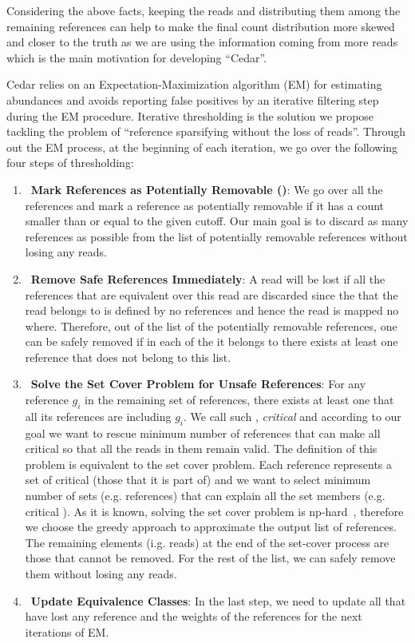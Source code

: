 Considering the above facts, keeping the reads and
distributing them among the remaining references
can help to make the final count distribution more skewed and closer to the truth
as we are using the information coming from more reads
which is the main motivation for developing ``Cedar''.

Cedar relies on an Expectation-Maximization algorithm (EM) for estimating abundances
and avoids reporting false positives by an iterative filtering step during the EM procedure.
Iterative thresholding is the solution we propose tackling the problem of
``reference sparsifying without the loss of reads''.
Through out the EM process, at the beginning of each iteration,
we go over the following four steps of thresholding:
\begin{enumerate}
    \item~\textbf{Mark References as Potentially Removable (\abpt)}:
    We go over all the references and mark a reference as potentially removable
    if it has a count smaller than or equal to the given cutoff.
    Our main goal is to discard as many references as possible
    from the list of potentially removable references without losing any reads.
    \item~\textbf{Remove Safe \abpt References Immediately}:
    A read will be lost if all the references that are equivalent over this read are discarded
    since the \eq that the read belongs to is defined by no references
    and hence the read is mapped no where.
    Therefore, out of the list of the potentially removable references,
    one can be safely removed if in each of the \eqs it belongs to there exists at least one reference
    that does not belong to this list.
    \item~\textbf{Solve the Set Cover Problem for Unsafe \abpt References}:
    For any reference $g_i$ in the remaining set of \abpt references,
    there exists at least one \eq that all its references are \abpt including $g_i$.
    We call such \eqs, \textit{critical \eqs} and according to our goal
    we want to rescue minimum number of \abpt references that can make all critical \eqs
    so that all the reads in them remain valid.
    The definition of this problem is equivalent to the set cover problem.
    Each reference represents a set of critical \eqs (those that it is part of)
    and we want to select minimum number of sets (e.g. references)
    that can explain all the set members (e.g. critical \eqs).
    As it is known, solving the set cover problem is np-hard~\cite{},
    therefore we choose the greedy approach to approximate the output list of references.
    The remaining elements (i.g. reads) at the end of the set-cover process are those that cannot be removed.
    For the rest of the list, we can safely remove them without losing any reads.
    \item~\textbf{Update Equivalence Classes}:
    In the last step, we need to update all \eqs that have lost any reference
    and the weights of the references for the next iterations of EM.
\end{enumerate}

